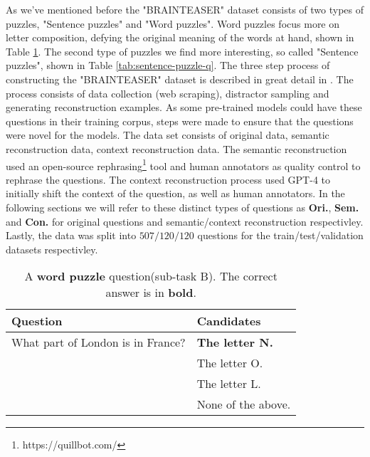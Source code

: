 As we've mentioned before the "BRAINTEASER" dataset consists of two types of puzzles, "Sentence puzzles"
and "Word puzzles".  Word puzzles focus more on letter composition, defying the original meaning
of the words at hand, shown in Table \ref{tab:word-puzzle-q}. 
The second type of puzzles we find more interesting, so called "Sentence puzzles", shown in Table
\ref{tab:sentence-puzzle-q}. The three step process of constructing the "BRAINTEASER" dataset
is described in great detail in \citep{semeval}. The process consists of data collection
(web scraping),
distractor sampling and generating reconstruction examples. As some pre-trained models could have
these questions in their training corpus, steps were made to ensure that the questions were novel
for the models.  The data set consists of original data, semantic reconstruction data, context
reconstruction data. The semantic reconstruction used an open-source rephrasing\footnote[2]{https://quillbot.com/} tool and 
human annotators as quality control to rephrase the questions. The context reconstruction process
used GPT-4 to initially shift the context of the question, as well as human annotators. In the 
following sections we will refer to these distinct types of questions as \textbf{Ori.},
\textbf{Sem.} and 
\textbf{Con.} for original questions and semantic/context reconstruction respectivley. Lastly, the
data was split into $507/120/120$ questions for the train/test/validation datasets respectivley.
  

\begin{table}
	\caption{A \textbf{word puzzle} question(sub-task B). The correct answer is in \textbf{bold}.}
	\label{tab:word-puzzle-q}
	\begin{center}
		\begin{tabular}{p{3.5cm}|p{3.5cm}}
			\toprule
			Question                          & Candidates             \\
			\midrule
			What part of London is in France? & \textbf{The letter N.} \\
			                                  & The letter O.          \\
			                                  & The letter L.           \\
			                                  & None of the above.      \\
			\bottomrule
		\end{tabular}
	\end{center}
\end{table}




